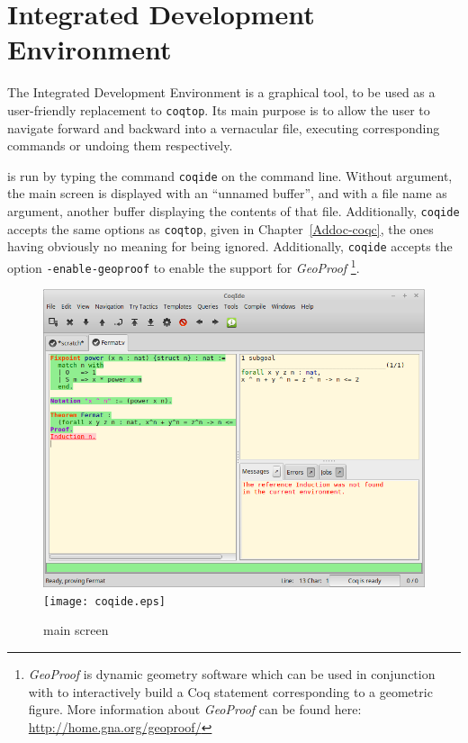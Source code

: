 \chapter[\Coq{} Integrated Development Environment]{\Coq{} Integrated Development Environment\label{Addoc-coqide}
}

The \Coq{} Integrated Development Environment is a graphical tool, to
be used as a user-friendly replacement to \texttt{coqtop}. Its main
purpose is to allow the user to navigate forward and backward into a
\Coq{} vernacular file, executing corresponding commands or undoing
them respectively. %

\CoqIDE{} is run by typing the command \verb|coqide| on the command
line. Without argument, the main screen is displayed with an ``unnamed
buffer'', and with a file name as argument, another buffer displaying
the contents of that file. Additionally, \verb|coqide| accepts the same
options as \verb|coqtop|, given in Chapter~\ref{Addoc-coqc}, the ones having
obviously no meaning for \CoqIDE{} being ignored. Additionally, \verb|coqide| accepts the option \verb|-enable-geoproof| to enable the support for \emph{GeoProof} \footnote{\emph{GeoProof} is dynamic geometry software which can be used in conjunction with \CoqIDE{} to interactively build a Coq statement corresponding to a geometric figure. More information about \emph{GeoProof} can be found here: \url{http://home.gna.org/geoproof/} }. 
  

\begin{figure}[t]
\begin{center}
\ifpdf   %
\includegraphics[width=1.0\textwidth]{coqide.png}
\else
\texttt{[image: coqide.eps]}
\fi
\end{center}
\caption{\CoqIDE{} main screen}
\label{fig:coqide}
\end{figure}

